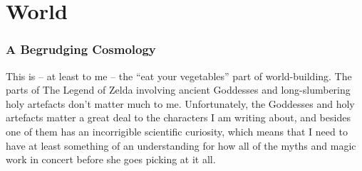 \documentclass[../FGP.tex]{subfiles}
\begin{document}
% 
\setmarginpargeometry
\part{World}
\section{A Begrudging Cosmology}
This is -- at least to me -- the ``eat your vegetables'' part of world-building. The parts of The Legend of Zelda involving ancient Goddesses and long-slumbering holy artefacts don't matter much to me. Unfortunately, the Goddesses and holy artefacts matter a great deal to the characters I am writing about, and besides one of them has an incorrigible scientific curiosity,%
which means that I need to have at least something of an understanding for how all of the myths and magic work in concert before she goes picking at it all.
\end{document}
